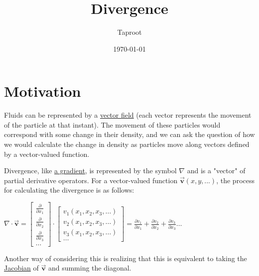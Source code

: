 \documentclass[letterpaper]{article}
\author{Taproot}
\date{\today}
\title{Divergence}
\renewcommand\maketitle{}
\begin{document}
\maketitle

\section{Motivation}
\label{sec:org2bf8bfc}
Fluids can be represented by a \href{20200831153854-vector\_field.org}{vector field} (each vector represents the movement of the particle at that instant). The movement of these particles would correspond with some change in their density, and we can ask the question of how we would calculate the change in density as particles move along vectors defined by a vector-valued function.

Divergence, like \href{20200830000157-gradients.org}{a gradient}, is represented by the symbol \(\nabla\) and is a "vector" of partial derivative operators. For a vector-valued function \(\vec{\mathbf{v}}(x,y,...)\), the process for calculating the divergence is as follows:

\(\nabla \cdot \vec{\mathbf{v}} = \left[\begin{matrix} \frac{\partial}{\partial x_1} \\ \frac{\partial}{\partial x_2} \\ \frac{\partial}{\partial x_3} \\ \ldots \end{matrix}\right] \cdot \left[\begin{matrix} v_1(x_1, x_2, x_3, \ldots) \\ v_2(x_1, x_2, x_3, \ldots) \\ v_3(x_1, x_2, x_3, \ldots) \\ \ldots\end{matrix}\right] = \frac{\partial v_1}{\partial x_1} + \frac{\partial v_2}{\partial x_2} + \frac{\partial v_3}{\partial x_3} \ldots\)

Another way of considering this is realizing that this is equivalent to taking the \href{20200830000754-jacobian.org}{Jacobian} of \(\vec{\mathbf{v}}\) and summing the diagonal.
\end{document}
